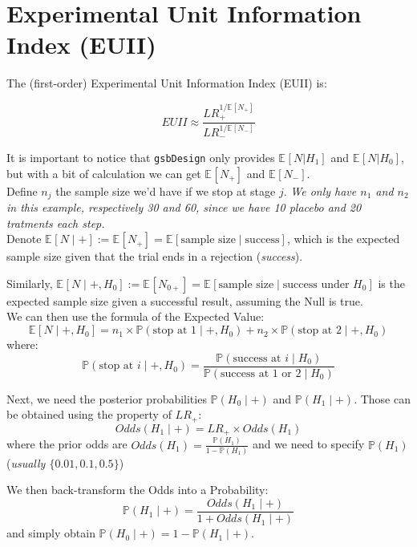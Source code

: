 \documentclass{article}\usepackage[]{graphicx}\usepackage[]{xcolor}
\newcommand{\E}[2][]{\mathbb{E}_{#1}\left[#2\right]}
\newcommand{\Prob}[1]{\mathbb{P}\left(#1\right)}
\begin{document}
\clearpage

\section*{Experimental Unit Information Index (EUII)}

The (first-order) Experimental Unit Information Index (EUII) is:

\begin{equation}
    EUII \approx \frac{LR_+^{1/\E{N_+}}}{LR_-^{1/\E{N_-}}}
\end{equation}

It is important to notice that \texttt{gsbDesign} only provides $\E{N|H_1}$ and $\E{N|H_0}$, 
but with a bit of calculation we can get $\E{N_+}$ and $\E{N_-}$.\\ 

Define $n_j$ the sample size we'd have if we stop at stage $j$. 
\textit{We only have $n_1$ and $n_2$ in this example, respectively 30 and 60, since we have 10 placebo and 20 tratments each step.} \\ 


Denote $\E{N  \mid +} := \E{N_+} = \E{\text{sample size} \mid \text{success}}$, which is the expected sample size given that the trial ends in a rejection (\textit{success}). 

Similarly, $\E{N  \mid +, H_0 } := \E{N_{0+}} = \E{\text{sample size} \mid \text{success under } H_0}$ is the expected sample size given a successful result, assuming the Null is true. \\

We can then use the formula of the Expected Value:
$$ \E{N  \mid +, H_0} = n_1 \times \Prob{\text{stop at 1} \mid +, H_0} + n_2 \times \Prob{\text{stop at 2} \mid +, H_0} $$
where:
$$ \Prob{\text{stop at } i \mid +, H_0} = \frac{\Prob{\text{success at } i \mid H_0}}{\Prob{\text{success at 1 or 2} \mid H_0}} $$

Next, we need the posterior probabilities $\Prob{H_0  \mid +}$ and $\Prob{H_1  \mid +}$. Those can be obtained using the property of $LR_+$:
$$ Odds(H_1  \mid +) = LR_+ \times Odds(H_1) $$ 
where the prior odds are $Odds(H_1) = \frac{\Prob{H_1}}{1 - \Prob{H_1}}$ and we need to specify $\Prob{H_1}$ (\textit{usually $\{0.01, 0.1, 0.5\}$})
 
We then back-transform the Odds into a Probability:
$$ \Prob{H_1  \mid +} = \frac{Odds(H_1  \mid +)}{1 + Odds(H_1  \mid +)} $$
and simply obtain $\Prob{H_0  \mid +} = 1 - \Prob{H_1  \mid +}$.
\end{document}
